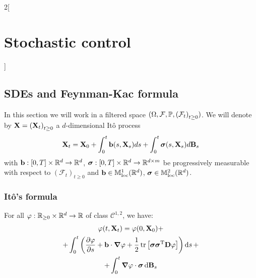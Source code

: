 \documentclass[../../../main_math.tex]{subfiles}
\begin{document}
\begin{multicols}{2}[\section{Stochastic control}]
  \subsection{SDEs and Feynman-Kac formula}
  In this section we will work in a filtered space $(\Omega, \mathcal{F}, \mathbb{P}, {(\mathcal{F}_t)}_{t\geq 0})$. We will denote by $\boldsymbol{\mathrm{X}}={(\boldsymbol{\mathrm{X}}_t)}_{t\geq 0}$ a $d$-dimensional Itô process
  $$
    \boldsymbol{\mathrm{X}}_t=\boldsymbol{\mathrm{X}}_0+\int_0^t \boldsymbol{\mathrm{b}}(s,\boldsymbol{\mathrm{X}}_s)ds+\int_0^t \boldsymbol{\mathrm{\sigma}}(s,\boldsymbol{\mathrm{X}}_s)d\boldsymbol{\mathrm{B}}_s
  $$
  with $\boldsymbol{\mathrm{b}}:[0,T]\times\mathbb{R}^d\to \mathbb{R}^d$, $\boldsymbol{\mathrm{\sigma}}:[0,T]\times\mathbb{R}^d\to \mathbb{R}^{d\times m}$ be progressively measurable with respect to ${(\mathcal{F}_t)}_{t\geq 0}$ and  $\boldsymbol{\mathrm{b}}\in\mathbb{M}^1_{\text{loc}}(\mathbb{R}^d)$, $\boldsymbol{\mathrm{\sigma}}\in\mathbb{M}^2_{\text{loc}}(\mathbb{R}^d)$.
  \subsubsection{Itô's formula}
  \begin{theorem}\label{SCO:ito_formula}
    For all $\varphi:\mathbb{R}_{\geq 0}\times\mathbb{R}^d\to\mathbb{R}$ of class $\mathcal{C}^{1,2}$, we have:
    \begin{multline*}
      \varphi(t,\boldsymbol{\mathrm{X}}_t)=\varphi(0,\boldsymbol{\mathrm{X}}_0)+\\+\int_0^t \left(\pdv{\varphi}{s}+\boldsymbol{\mathrm{b}}\cdot\grad\varphi+\frac{1}{2}\tr\left[\boldsymbol{\mathrm{\sigma}}{\boldsymbol{\mathrm{\sigma}}}^{\mathrm{T}}\boldsymbol{\mathrm{D}}\varphi\right]\right)\dd{s}+\\+\int_0^t \grad\varphi\cdot\boldsymbol{\mathrm{\sigma}}\dd{\boldsymbol{\mathrm{B}}_s}
    \end{multline*}
  \end{theorem}

\end{multicols}
\end{document}
